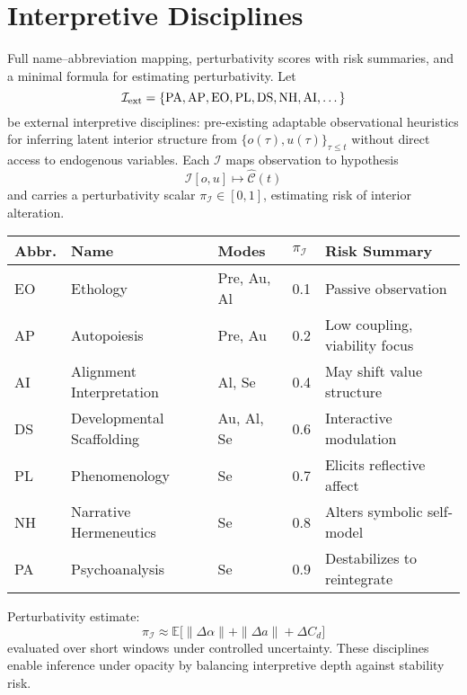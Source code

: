 \documentclass{article}
\begin{document}
\section{Interpretive Disciplines}
Full name--abbreviation mapping, perturbativity scores with risk summaries, and a minimal formula for estimating perturbativity.
Let
\[
\mathcal{I}_{\rm ext} = \{\mathrm{PA}, \mathrm{AP}, \mathrm{EO}, \mathrm{PL}, \mathrm{DS}, \mathrm{NH}, \mathrm{AI}, \dots\}
\]
be external interpretive disciplines: pre-existing adaptable observational heuristics for inferring latent interior structure from $\{o(\tau), u(\tau)\}_{\tau \le t}$ without direct access to endogenous variables. Each $\mathcal{I}$ maps observation to hypothesis
\[
\mathcal{I}[o,u] \mapsto \hat{\mathcal{C}}(t)
\]
and carries a perturbativity scalar $\pi_{\mathcal{I}} \in [0,1]$, estimating risk of interior alteration.

\begin{center}
\begin{tabular}{lllll}
\toprule
Abbr.&Name&Modes&$\pi_{\mathcal{I}}$&Risk Summary\\
\midrule
EO&Ethology&Pre, Au, Al&0.1&Passive observation\\
AP&Autopoiesis&Pre, Au&0.2&Low coupling, viability focus\\
AI&Alignment Interpretation&Al, Se&0.4&May shift value structure\\
DS&Developmental Scaffolding&Au, Al, Se&0.6&Interactive modulation\\
PL&Phenomenology&Se&0.7&Elicits reflective affect\\
NH&Narrative Hermeneutics&Se&0.8&Alters symbolic self-model\\
PA&Psychoanalysis&Se&0.9&Destabilizes to reintegrate\\
\bottomrule
\end{tabular}
\end{center}

Perturbativity estimate:
\[
\pi_{\mathcal{I}} \approx \mathbb{E}\bigl[\|\Delta \alpha\| + \|\Delta a\| + \Delta C_d\bigr]
\]
evaluated over short windows under controlled uncertainty.
These disciplines enable inference under opacity by balancing interpretive depth against stability risk.

\end{document}
